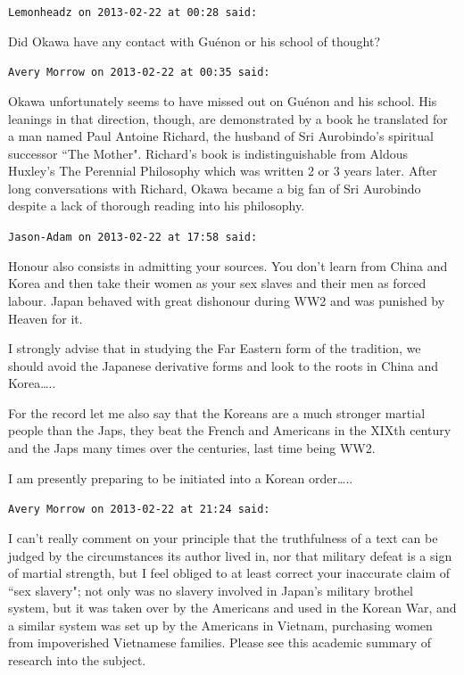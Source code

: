 \begin{footnotesize}\begin{sffamily}



\texttt{Lemonheadz on 2013-02-22 at 00:28 said: }

Did Okawa have any contact with Guénon or his school of thought?


\hfill

\texttt{Avery Morrow on 2013-02-22 at 00:35 said: }

Okawa unfortunately seems to have missed out on Guénon and his school. His leanings in that direction, though, are demonstrated by a book he translated for a man named Paul Antoine Richard, the husband of Sri Aurobindo's spiritual successor ``The Mother". Richard's book is indistinguishable from Aldous Huxley's The Perennial Philosophy which was written 2 or 3 years later. After long conversations with Richard, Okawa became a big fan of Sri Aurobindo despite a lack of thorough reading into his philosophy.


\hfill

\texttt{Jason-Adam on 2013-02-22 at 17:58 said: }

Honour also consists in admitting your sources. You don't learn from China and Korea and then take their women as your sex slaves and their men as forced labour. Japan behaved with great dishonour during WW2 and was punished by Heaven for it.

I strongly advise that in studying the Far Eastern form of the tradition, we should avoid the Japanese derivative forms and look to the roots in China and Korea…..

For the record let me also say that the Koreans are a much stronger martial people than the Japs, they beat the French and Americans in the XIXth century and the Japs many times over the centuries, last time being WW2.

I am presently preparing to be initiated into a Korean order…..


\hfill

\texttt{Avery Morrow on 2013-02-22 at 21:24 said: }

I can't really comment on your principle that the truthfulness of a text can be judged by the circumstances its author lived in, nor that military defeat is a sign of martial strength, but I feel obliged to at least correct your inaccurate claim of ``sex slavery"; not only was no slavery involved in Japan's military brothel system, but it was taken over by the Americans and used in the Korean War, and a similar system was set up by the Americans in Vietnam, purchasing women from impoverished Vietnamese families. Please see this academic summary of research into the subject.



\end{sffamily}
\end{footnotesize}

